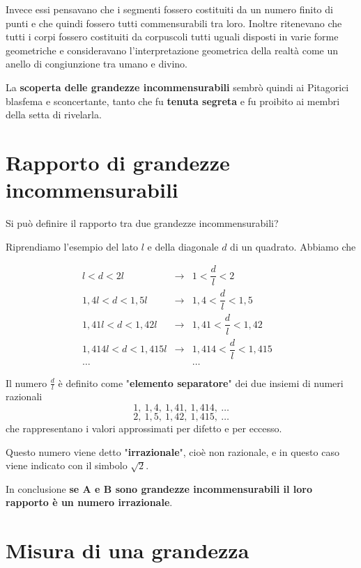 \documentclass[a4paper,12pt]{article}
\theoremstyle{definition}
\theoremstyle{remark}
\begin{document}
Invece essi pensavano che i segmenti fossero costituiti da un numero finito di punti e che quindi fossero tutti commensurabili tra loro. Inoltre ritenevano che tutti i corpi fossero costituiti da corpuscoli tutti uguali disposti in varie forme geometriche e consideravano l'interpretazione geometrica della realtà come un anello di congiunzione tra umano e divino.

La \textbf{scoperta delle grandezze incommensurabili} sembrò quindi ai Pitagorici blasfema e sconcertante, tanto che fu \textbf{tenuta segreta} e fu proibito ai membri della setta di rivelarla.

\section*{Rapporto di grandezze incommensurabili}

Si può definire il rapporto tra due grandezze incommensurabili?

Riprendiamo l'esempio del lato $l$ e della diagonale $d$ di un quadrato.
Abbiamo che

$$\begin{array}{lclcl}
l < d < 2l & \rightarrow & 1 < \dfrac{d}{l} < 2 & \\[4pt]
1{,}4l < d < 1{,}5l & \rightarrow & 1{,}4 < \dfrac{d}{l} < 1{,}5 & \\[4pt]
1{,}41l < d < 1{,}42l & \rightarrow & 1{,}41 < \dfrac{d}{l} < 1{,}42 & \\[4pt]
1{,}414l < d < 1{,}415l & \rightarrow & 1{,}414 < \dfrac{d}{l} < 1{,}415 & \\[4pt]
\ldots & & \ldots &
\end{array}$$

Il numero $\frac{d}{l}$ è definito come "\textbf{elemento separatore}" dei due insiemi di numeri razionali
$$1, \ 1{,}4, \ 1{,}41, \ 1{,}414, \ \ldots$$
$$2, \ 1{,}5, \ 1{,}42, \ 1{,}415, \ \ldots$$
che rappresentano i valori approssimati per difetto e per eccesso.

Questo numero viene detto "\textbf{irrazionale}", cioè non razionale, e in questo caso viene indicato con il simbolo $\sqrt{2}$.

In conclusione \textbf{se A e B sono grandezze incommensurabili il loro rapporto è un numero irrazionale}.

\newpage

\section{Misura di una grandezza}
\end{document}
